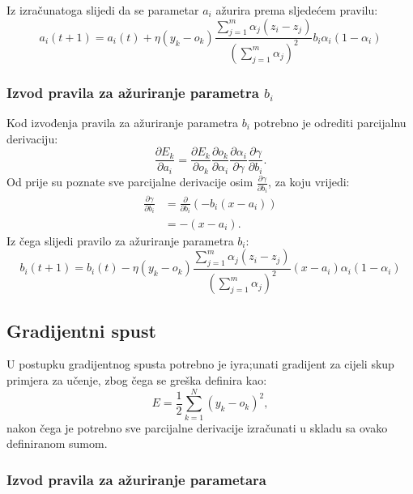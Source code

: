 \documentclass[12pt, a4paper, numeric]{article}
\begin{document}
Iz izračunatoga slijedi da se parametar $a_i$ ažurira prema sljedećem pravilu:
\[
    a_i(t+1) = a_i(t) + \eta (y_k - o_k) \frac{\sum_{j=1}^{m}\alpha_j(z_i-z_j)}{(\sum_{j=1}^{m}\alpha_j)^2} b_i\alpha_i (1 - \alpha_i)
\]

\subsubsection{Izvod pravila za ažuriranje parametra $b_i$}
Kod izvođenja pravila za ažuriranje parametra $b_i$ potrebno je odrediti parcijalnu derivaciju:
\[
    \frac{\partial E_k}{\partial a_i} = \frac{\partial E_k}{\partial o_k} 
                                        \frac{\partial o_k}{\partial \alpha_i} 
                                        \frac{\partial \alpha_i}{\partial \gamma}
                                        \frac{\partial \gamma}{\partial b_i}.
\]
Od prije su poznate sve parcijalne derivacije osim $\frac{\partial \gamma}{\partial b_i}$, za koju vrijedi:
\begin{equation*}
    \begin{split}
        \frac{\partial \gamma}{\partial b_i}
            &= \frac{\partial}{\partial b_i}(-b_i(x-a_i))\\
            &= -(x-a_i).
    \end{split}
\end{equation*}
Iz čega slijedi pravilo za ažuriranje parametra $b_i$:
\[
    b_i(t+1) = b_i(t) - \eta (y_k - o_k) \frac{\sum_{j=1}^{m}\alpha_j(z_i-z_j)}{(\sum_{j=1}^{m}\alpha_j)^2} (x - a_i) \alpha_i (1 - \alpha_i)
\]

\subsection{Gradijentni spust}
U postupku gradijentnog spusta potrebno je iyra;unati gradijent za cijeli skup primjera za učenje, zbog čega se greška definira kao:
\[
    E =  \frac{1}{2}\sum_{k=1}^{N}(y_k - o_k)^2,
\]
nakon čega je potrebno sve parcijalne derivacije izračunati u skladu sa ovako definiranom sumom.

\subsubsection{Izvod pravila za ažuriranje parametara}
\end{document}
